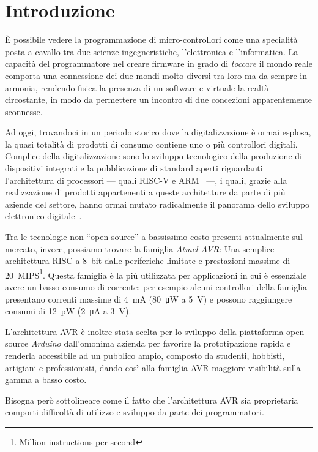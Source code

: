 \chapter{Introduzione}

È possibile vedere la programmazione di micro-controllori come una specialità posta a cavallo tra due scienze ingegneristiche, l'elettronica e l'informatica.
La capacità del programmatore nel creare firmware in grado di \textit{toccare} il mondo reale comporta una connessione dei due mondi molto diversi tra loro ma da sempre in armonia, rendendo fisica la presenza di un software e virtuale la realtà circostante, in modo da permettere un incontro di due concezioni apparentemente sconnesse.

Ad oggi, trovandoci in un periodo storico dove la digitalizzazione è ormai esplosa, la quasi totalità di prodotti di consumo contiene uno o più controllori digitali.
Complice della digitalizzazione sono lo sviluppo tecnologico della produzione di dispositivi integrati e la pubblicazione di standard aperti riguardanti l'architettura di processori --- quali RISC-V e ARM~\cite{site:arm-licensing} ---, i quali, grazie alla realizzazione di prodotti appartenenti a queste architetture da parte di più aziende del settore, hanno ormai mutato radicalmente il panorama dello sviluppo elettronico digitale~\cite{arm-intel-phone-market}\cite{site:arm-press-200b-chips}.

Tra le tecnologie non ``open source'' a bassissimo costo presenti attualmente sul mercato, invece, possiamo trovare la famiglia \textit{Atmel AVR}: Una semplice architettura RISC a 8~bit dalle periferiche limitate e prestazioni massime di \SI{20}{MIPS}\footnote{Million instructions per second}.
Questa famiglia è la più utilizzata per applicazioni in cui è essenziale avere un basso consumo di corrente: per esempio alcuni controllori della famiglia presentano correnti massime di \SI{4}{\milli\ampere} (\SI{80}{\micro\watt} a \SI{5}{\volt}) e possono raggiungere consumi di \SI{12}{\pico\watt} (\SI{2}{\micro\ampere} a \SI{3}{\volt})\cite{avr:tiny4}.

L'architettura AVR è inoltre stata scelta per lo sviluppo della piattaforma open source \textit{Arduino} dall'omonima azienda per favorire la prototipazione rapida e renderla accessibile ad un pubblico ampio, composto da studenti, hobbisti, artigiani e professionisti\cite{site:arduino-about}, dando così alla famiglia AVR maggiore visibilità sulla gamma a basso costo.

Bisogna però sottolineare come il fatto che l'architettura AVR sia proprietaria comporti difficoltà di utilizzo e sviluppo da parte dei programmatori.

